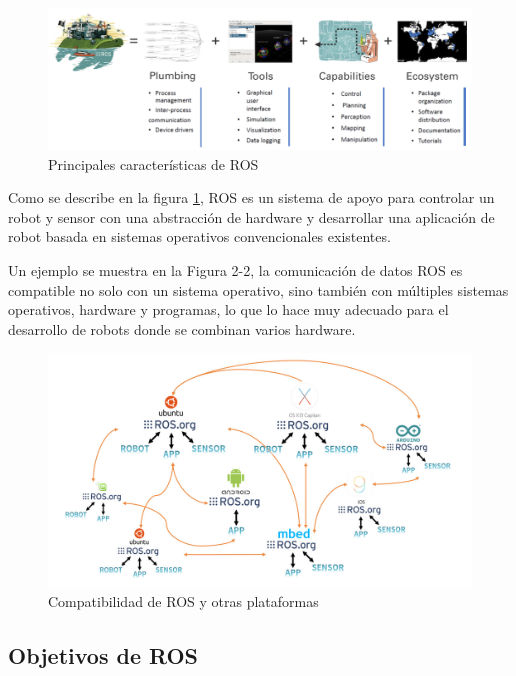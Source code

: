         \begin{figure}[htb]
            \centering
            \includegraphics[width=1.0\linewidth]{Main/Chapter3/Images3/3-4/caracteristicas-ros.png}
            \caption{Principales características de ROS}
            \label{f:Cap3-4_caracteristicas_ros}
        \end{figure}
        
        Como se describe en la figura \ref{f:Cap3-4_caracteristicas_ros}, ROS es un sistema de apoyo para controlar un robot y sensor con una abstracción de hardware y desarrollar una aplicación de robot basada en sistemas operativos convencionales existentes.
        
        Un ejemplo se muestra en la Figura 2-2, la comunicación de datos ROS es compatible no solo con un sistema operativo, sino también con múltiples sistemas operativos, hardware y programas, lo que lo hace muy adecuado para el desarrollo de robots donde se combinan varios hardware. 
        
        \begin{figure}[htb]
            \centering
            \includegraphics[width=0.9\linewidth]{Main/Chapter3/Images3/3-4/compatibilidad-ros.png}
            \caption{Compatibilidad de ROS y otras plataformas}
            \label{f:Cap3-4_compatibilidad_ros}
        \end{figure}
        
    \subsection{Objetivos de ROS}
    

